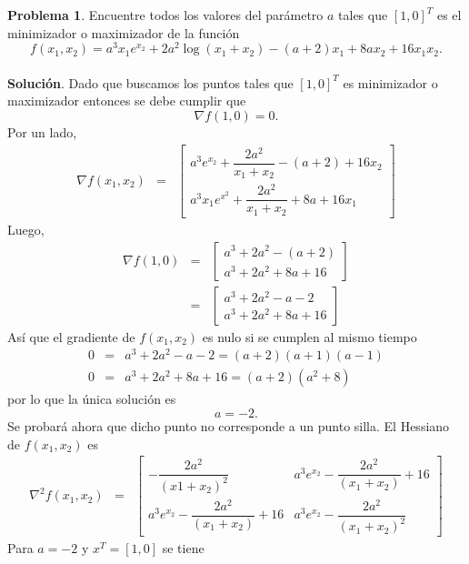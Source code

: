 \documentclass[12pt,letterpaper]{article}
\theoremstyle{definition}
\newtheorem{problm}{Problema}
\begin{document}
\begin{problm}
	Encuentre todos los valores del parámetro $ a $ tales que $ [1,0]^T $ es el minimizador o maximizador de la función
	\[ f(x_1, x_2) = a^3 x_1 e^{x_2} + 2 a^2 \log (x_1 + x_2) - (a + 2) x_1 + 8 a x_2 + 16 x_1 x_2 . \]
	\\
	\textbf{Solución}. Dado que buscamos los puntos tales que $ [1,0]^T $ es minimizador o maximizador entonces se debe cumplir que
	\[ \nabla f(1,0) = 0. \]
	Por un lado,
	\begin{eqnarray*}
		\nabla f(x_1, x_2) & = & \left[ \begin{matrix}
										a^3 e^{x_2} + \dfrac{2a^2}{x_1 + x_2} - (a+2) + 16 x_2 \\
										a^3 x_1 e^{x^2} + \dfrac{2a^2}{x_1 + x_2} + 8a + 16 x_1
									\end{matrix} \right]
	\end{eqnarray*}
	Luego,
	\begin{eqnarray*}
		\nabla f(1, 0) & = & \left[ \begin{matrix}
									a^3 +2a^2 - (a+2) \\
									a^3  +2a^2 + 8a + 16
								\end{matrix} \right] \\
						   & = & \left[ \begin{matrix}
								  	a^3 +2a^2 - a - 2 \\
								  	a^3  +2a^2 + 8a + 16
								  \end{matrix} \right]
	\end{eqnarray*}
	Así que el gradiente de $ f(x_1, x_2) $ es nulo si se cumplen al mismo tiempo
	\begin{eqnarray*}
		0 & = & a^3 +2a^2 - a - 2 = (a+2)(a+1)(a-1) \\
		0 & = & a^3  +2a^2 + 8a + 16 = (a+2) (a^2 + 8)
	\end{eqnarray*}
	por lo que la única solución es
	\[ a = -2. \]
	Se probará ahora que dicho punto no corresponde a un punto silla. El Hessiano de $ f(x_1, x_2) $ es
	\begin{eqnarray*}
		\nabla^2 f(x_1, x_2) & = & \left[\begin{matrix}
										- \dfrac{2a^2}{(x1 + x_2)^2} & a^3 e^{x_2} - \dfrac{2a^2}{(x_1 + x_2)} + 16 \\
										a^3 e^{x_2} - \dfrac{2a^2}{(x_1 + x_2)} + 16 & a^3 e^{x_2} - \dfrac{2a^2}{(x_1 + x_2)^2}
		\end{matrix}\right]
	\end{eqnarray*}
	Para $ a = -2 $ y $ x^T = [1,0] $ se tiene

\end{problm}
\end{document}
